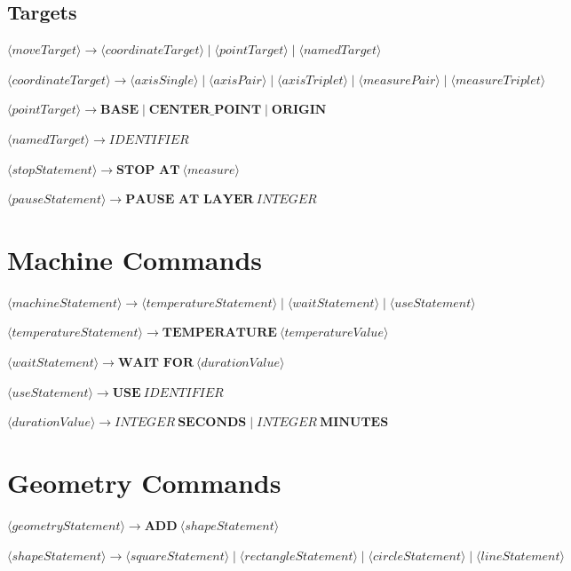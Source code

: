 \subsection{Targets}

\(
\langle moveTarget \rangle \rightarrow
\langle coordinateTarget \rangle
\mid \langle pointTarget \rangle
\mid \langle namedTarget \rangle
\)

\(
\langle coordinateTarget \rangle \rightarrow
\langle axisSingle \rangle
\mid \langle axisPair \rangle
\mid \langle axisTriplet \rangle
\mid \langle measurePair \rangle
\mid \langle measureTriplet \rangle
\)

\(
\langle pointTarget \rangle \rightarrow \textbf{BASE} \mid \textbf{CENTER\_POINT} \mid \textbf{ORIGIN}
\)

\(
\langle namedTarget \rangle \rightarrow IDENTIFIER
\)

\(
\langle stopStatement \rangle \rightarrow \textbf{STOP AT} \ \langle measure \rangle
\)

\(
\langle pauseStatement \rangle \rightarrow \textbf{PAUSE AT LAYER} \ INTEGER
\)

\section{Machine Commands}

\(
\langle machineStatement \rangle \rightarrow
\langle temperatureStatement \rangle
\mid \langle waitStatement \rangle
\mid \langle useStatement \rangle
\)

\(
\langle temperatureStatement \rangle \rightarrow \textbf{TEMPERATURE} \ \langle temperatureValue \rangle
\)

\(
\langle waitStatement \rangle \rightarrow \textbf{WAIT FOR} \ \langle durationValue \rangle
\)

\(
\langle useStatement \rangle \rightarrow \textbf{USE} \ IDENTIFIER
\)

\(
\langle durationValue \rangle \rightarrow INTEGER\ \textbf{SECONDS} \mid INTEGER\ \textbf{MINUTES}
\)

\section{Geometry Commands}

\(
\langle geometryStatement \rangle \rightarrow \textbf{ADD} \ \langle shapeStatement \rangle
\)

\(
\langle shapeStatement \rangle \rightarrow
\langle squareStatement \rangle
\mid \langle rectangleStatement \rangle
\mid \langle circleStatement \rangle
\mid \langle lineStatement \rangle
\)


